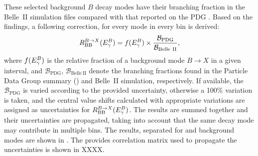 These selected background $B$ decay modes have their branching fraction in the Belle~II simulation files compared with that reported on the PDG \cite{Workman:2022ynf}.
Based on the findings, a following correction, for every mode in every \EB bin is derived:
\begin{equation}\label{eq:background_bf_correction}
    R^{B\rightarrow X}_{\mathrm{BB}}({E^B_{\gamma}}) =  f({E^B_{\gamma}}) \times \frac{\mathcal{B}_{\mathrm{PDG}}}{\mathcal{B}_{\mathrm{Belle~II}}},
\end{equation}
where $f({E^B_{\gamma}})$ is the relative fraction of a background mode $B\to X$ in a given \EB interval,
and $\mathcal{B}_{\mathrm{PDG}}$, $\mathcal{B}_{\mathrm{Belle~II}}$ denote the branching fractions found in the Particle Data Group summary (\cite{Workman:2022ynf}) and Belle~II simulation, respectively.
If available, the $\mathcal{B}_{\mathrm{PDG}}$ is varied according to the provided uncertainty, otherwise a 100\% variation is taken, and the central value shifts calculated with appropriate variations are assigned as uncertainties for $R^{B\rightarrow X}_{\mathrm{BB}}({E^B_{\gamma}})$.
The results are summed together and their uncertainties are propagated, taking into account that the same decay mode may contribute in multiple \EB bins.
The results, separated for \Bp and \Bz background modes are shown in .
The provides correlation matrix used to propagate the uncertainties is shown in XXXX.

\begin{table}[htbp!]
    \centering
    \caption{ \label{tab:background_modelling_uncertainties} 
    Expected relative background modelling corrections and their uncertainties 
    as a fraction of leftover peaking background yield in each bin.}
\end{table}